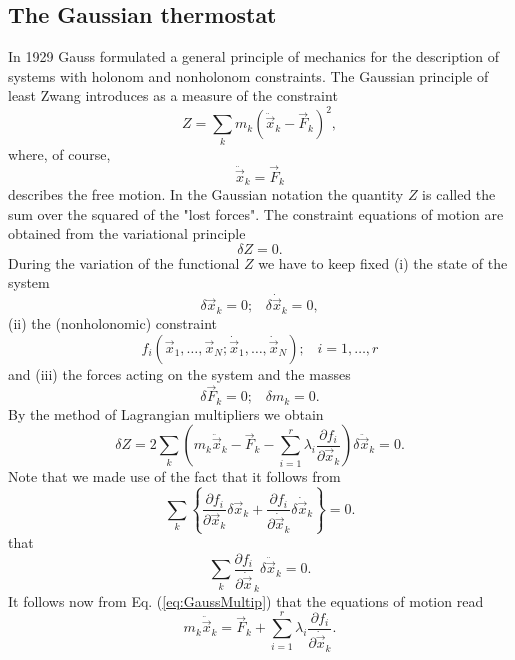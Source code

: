 \subsection{The Gaussian thermostat}
In 1929 Gauss formulated a general principle of mechanics for the 
description of systems with holonom and nonholonom constraints. 
The Gaussian principle of least Zwang introduces as a measure of the constraint
\begin{displaymath}
  Z = \sum_k m_k (\ddot{\vec{x}}_k - \vec{F}_k )^2,
\end{displaymath}
where, of course,
\begin{displaymath}
  \ddot{\vec{x}}_k = \vec{F}_k
\end{displaymath}
describes the free motion. In the Gaussian notation the quantity $Z$ is called
the sum over the squared of the "lost forces". The constraint equations of
motion are obtained from the variational principle
\begin{displaymath}
  \delta Z =0.
\end{displaymath}
During the variation of the functional $Z$ we have to keep fixed (i) 
the state of the system
\begin{displaymath}
  \delta \vec{x}_k =0; \;\;\; \delta \dot{\vec{x}}_k =0,
\end{displaymath}
(ii) the (nonholonomic) constraint
\begin{displaymath}
f_i(\vec{x}_1, \ldots, \vec{x}_N; \dot{\vec{x}}_1, \ldots, \dot{\vec{x}}_N);
 \;\;\; i=1, \ldots, r  
\end{displaymath}
and (iii) the forces acting on the system and the masses
\begin{displaymath}
  \delta \vec{F}_k =0; \;\;\; \delta m_k =0.
\end{displaymath}
By the method of Lagrangian multipliers we obtain
\begin{displaymath}
  \delta Z = 2 \sum_k ( m_k \ddot{\vec{x}}_k - \vec{F}_k - 
                        \sum_{i=1}^r \lambda_i 
                        \frac{\partial f_i}{\partial \vec{x}_k}
                       ) \delta \ddot{\vec{x}}_k =0.
\end{displaymath}
Note that we made use of the fact that it follows from
\begin{equation}
\label{eq:GaussMultip}
  \sum_k \left\{ \frac{\partial f_i}{\partial \vec{x}_k}  \delta \vec{x}_k
              + \frac{\partial f_i}{\partial \dot{\vec{x}}_k} 
                       \delta \dot{\vec{x}}_k \right\} =0.
\end{equation}
that
\begin{displaymath}
  \sum_k \frac{\partial f_i}{\partial \dot{\vec{x}}}_k \delta \ddot{\vec{x}}_k
          =0.
\end{displaymath}
It follows now from Eq. (\ref{eq:GaussMultip}) that the equations of motion 
read
\begin{equation}
\label{eq:GaussEq}
  m_k \ddot{\vec{x}}_k = \vec{F}_k + \sum_{i=1}^r \lambda_i 
                   \frac{\partial f_i}{\partial \dot{\vec{x}}_k}.
\end{equation}

